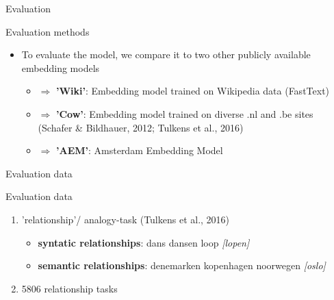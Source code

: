 \documentclass{beamer}
\begin{document}
\begin{frame}{Evaluation}
\begin{block}{Evaluation methods}
\begin{itemize}
\item To evaluate the model, we compare it to two other publicly available embedding models
\begin{itemize}
\item $\Rightarrow$ \textbf {'Wiki'}: Embedding model trained on Wikipedia data (FastText)
\item $\Rightarrow$ \textbf{'Cow'}: Embedding model trained on diverse .nl and .be sites (Schafer \& Bildhauer, 2012; Tulkens et al., 2016)
\item $\Rightarrow$ \textbf{'AEM'}: Amsterdam Embedding Model
\end{itemize}
\end{itemize}
\end{block}
\end{frame}


\begin{frame}{Evaluation data}
\begin{block}{Evaluation data}
\begin{enumerate}
\item 'relationship'/ analogy-task (Tulkens et al., 2016)
\begin{itemize}
\item \textbf{syntatic relationships}: dans dansen loop \textit{[lopen]}
\item \textbf{semantic relationships}: denemarken kopenhagen noorwegen \textit{[oslo]}
\end{itemize}
\item 5806 relationship tasks
\end{enumerate}
\end{block}
\end{frame}

\end{document}
